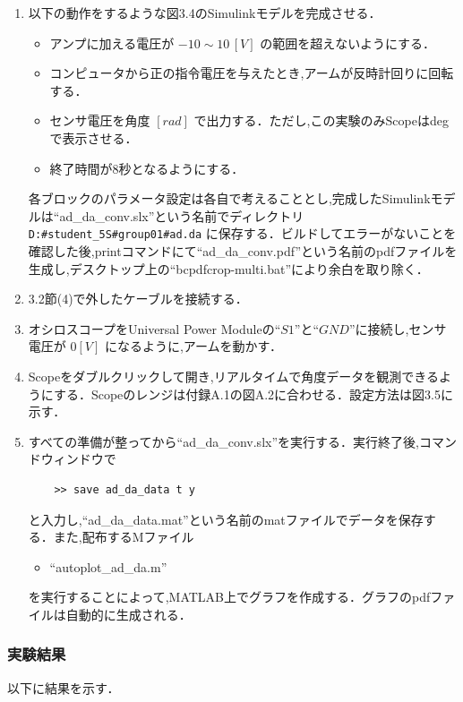 \begin{enumerate}
  \item 以下の動作をするような図3.4のSimulinkモデルを完成させる．
        \begin{itemize}
          \item アンプに加える電圧が $-10 \sim 10 \, [V]$ の範囲を超えないようにする．
          \item コンピュータから正の指令電圧を与えたとき,アームが反時計回りに回転する．
          \item センサ電圧を角度 $[rad]$ で出力する．ただし,この実験のみScopeはdegで表示させる．
          \item 終了時間が8秒となるようにする．
        \end{itemize}
        
        各ブロックのパラメータ設定は各自で考えることとし,完成したSimulinkモデルは“ad\_da\_conv.slx”という名前でディレクトリ \texttt{D:\#student\_5S\#group01\#ad.da} に保存する．ビルドしてエラーがないことを確認した後,printコマンドにて“ad\_da\_conv.pdf”という名前のpdfファイルを生成し,デスクトップ上の“bcpdfcrop-multi.bat”により余白を取り除く．
        
  \item 3.2節(4)で外したケーブルを接続する．
  \item オシロスコープをUniversal Power Moduleの“$S1$”と“$GND$”に接続し,センサ電圧が $0 [V]$ になるように,アームを動かす．
  \item Scopeをダブルクリックして開き,リアルタイムで角度データを観測できるようにする．Scopeのレンジは付録A.1の図A.2に合わせる．設定方法は図3.5に示す．
  \item すべての準備が整ってから“ad\_da\_conv.slx”を実行する．実行終了後,コマンドウィンドウで
        \begin{verbatim}
    >> save ad_da_data t y 
    \end{verbatim}
        と入力し,“ad\_da\_data.mat”という名前のmatファイルでデータを保存する．また,配布するMファイル
        \begin{itemize}
          \item “autoplot\_ad\_da.m”
        \end{itemize}
        を実行することによって,MATLAB上でグラフを作成する．グラフのpdfファイルは自動的に生成される．
\end{enumerate}

\subsubsection{実験結果}
以下に結果を示す．

